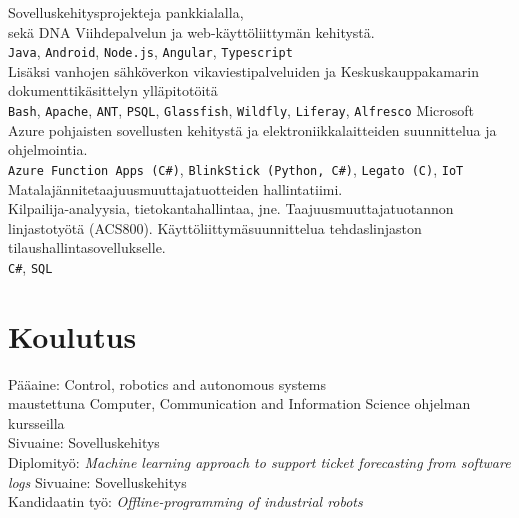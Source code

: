 \documentclass[letterpaper]{twentysecondcv}
\begin{document}
\begin{twenty} %
    {Sovelluskehitysprojekteja pankkialalla, \\
		sekä DNA Viihdepalvelun ja web-käyttöliittymän kehitystä.\\
		 \texttt{Java}, \texttt{Android}, \texttt{Node.js}, \texttt{Angular}, \texttt{Typescript} \\
	Lisäksi vanhojen sähköverkon vikaviestipalveluiden ja Keskuskauppakamarin dokumenttikäsittelyn ylläpitotöitä\\
     \texttt{Bash}, \texttt{Apache}, \texttt{ANT}, \texttt{PSQL}, \texttt{Glassfish}, \texttt{Wildfly}, \texttt{Liferay}, \texttt{Alfresco}}
    {Microsoft Azure pohjaisten sovellusten kehitystä ja elektroniikkalaitteiden suunnittelua ja ohjelmointia.\\
     \texttt{Azure Function Apps (C\#)}, \texttt{BlinkStick (Python, C\#)}, \texttt{Legato (C)}, \texttt{IoT}}
    {Matalajännitetaajuusmuuttajatuotteiden hallintatiimi.\\
		Kilpailija-analyysia, tietokantahallintaa, jne.}
    {Taajuusmuuttajatuotannon linjastotyötä (ACS800).}
    {Käyttöliittymäsuunnittelua tehdaslinjaston tilaushallintasovellukselle.\\
     \texttt{C\#}, \texttt{SQL}
    }
\end{twenty}




\section{Koulutus}

\begin{twenty} %
  {Pääaine: Control, robotics and autonomous systems \\
  maustettuna Computer, Communication and Information Science ohjelman kursseilla \\
  Sivuaine: Sovelluskehitys \\
  Diplomityö: \emph{Machine learning approach to support ticket forecasting from software logs}}
  {Sivuaine: Sovelluskehitys \\
	Kandidaatin työ: \emph{Offline-programming of industrial robots}}
\end{twenty}
\end{document}
